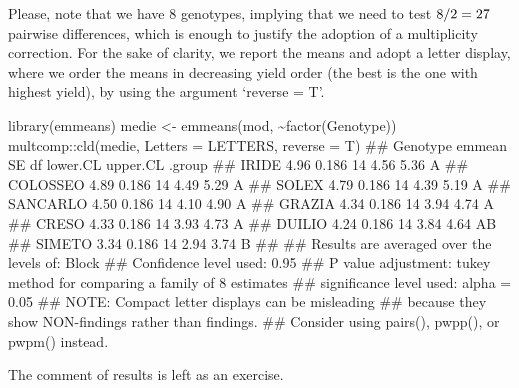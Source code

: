 \documentclass[a4paper,12pt,oneside]{book}
\newenvironment{Shaded}{\begin{snugshade}}{\end{snugshade}}
\newcommand{\SpecialCharTok}[1]{#1}
\newcommand{\DocumentationTok}[1]{#1}
\newcommand{\OtherTok}[1]{#1}
\newcommand{\FunctionTok}[1]{#1}
\newcommand{\AttributeTok}[1]{#1}
\newcommand{\AlertTok}[1]{#1}
\newcommand{\NormalTok}[1]{#1}
\begin{document}
Please, note that we have 8 genotypes, implying that we need to test \(8 \time 7 / 2 = 27\) pairwise differences, which is enough to justify the adoption of a multiplicity correction. For the sake of clarity, we report the means and adopt a letter display, where we order the means in decreasing yield order (the best is the one with highest yield), by using the argument `reverse = T'.

\scriptsize

\begin{Shaded}
\begin{Highlighting}[]
\FunctionTok{library}\NormalTok{(emmeans)}
\NormalTok{medie }\OtherTok{\textless{}{-}} \FunctionTok{emmeans}\NormalTok{(mod, }\SpecialCharTok{\textasciitilde{}}\FunctionTok{factor}\NormalTok{(Genotype))}
\NormalTok{multcomp}\SpecialCharTok{::}\FunctionTok{cld}\NormalTok{(medie, }\AttributeTok{Letters =}\NormalTok{ LETTERS, }\AttributeTok{reverse =}\NormalTok{ T)}
\DocumentationTok{\#\#  Genotype emmean    SE df lower.CL upper.CL .group}
\DocumentationTok{\#\#  IRIDE      4.96 0.186 14     4.56     5.36  A    }
\DocumentationTok{\#\#  COLOSSEO   4.89 0.186 14     4.49     5.29  A    }
\DocumentationTok{\#\#  SOLEX      4.79 0.186 14     4.39     5.19  A    }
\DocumentationTok{\#\#  SANCARLO   4.50 0.186 14     4.10     4.90  A    }
\DocumentationTok{\#\#  GRAZIA     4.34 0.186 14     3.94     4.74  A    }
\DocumentationTok{\#\#  CRESO      4.33 0.186 14     3.93     4.73  A    }
\DocumentationTok{\#\#  DUILIO     4.24 0.186 14     3.84     4.64  AB   }
\DocumentationTok{\#\#  SIMETO     3.34 0.186 14     2.94     3.74   B   }
\DocumentationTok{\#\# }
\DocumentationTok{\#\# Results are averaged over the levels of: Block }
\DocumentationTok{\#\# Confidence level used: 0.95 }
\DocumentationTok{\#\# P value adjustment: tukey method for comparing a family of 8 estimates }
\DocumentationTok{\#\# significance level used: alpha = 0.05 }
\DocumentationTok{\#\# }\AlertTok{NOTE}\DocumentationTok{: Compact letter displays can be misleading}
\DocumentationTok{\#\#       because they show NON{-}findings rather than findings.}
\DocumentationTok{\#\#       Consider using \textquotesingle{}pairs()\textquotesingle{}, \textquotesingle{}pwpp()\textquotesingle{}, or \textquotesingle{}pwpm()\textquotesingle{} instead.}
\end{Highlighting}
\end{Shaded}

\normalsize

The comment of results is left as an exercise.
\end{document}
